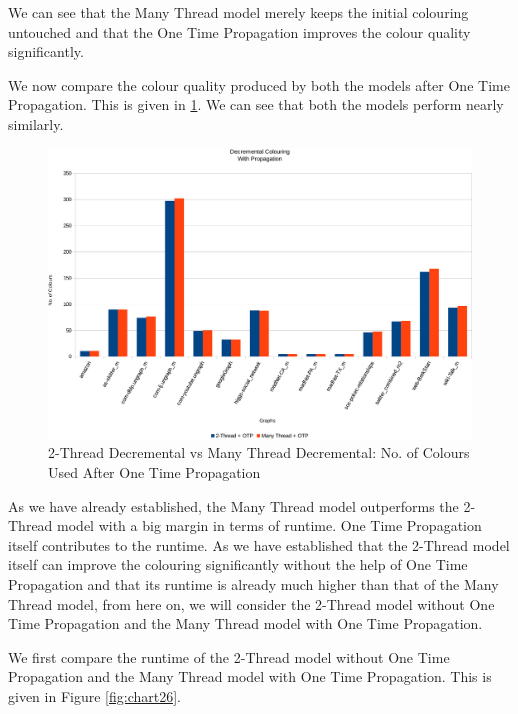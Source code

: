 \documentclass[MTech]{iitmdiss}
\begin{document}
We can see that the Many Thread model merely keeps the initial colouring untouched and that the One Time Propagation improves the colour quality significantly.

We now compare the colour quality produced by both the models after One Time Propagation. This is given in \ref{fig:chart25}. We can see that both the models perform nearly similarly.

\begin{figure}[h]
    \centering
    \includegraphics[width=\textwidth,keepaspectratio=true]{chartNewest25.pdf}
    \caption{
        2-Thread Decremental vs Many Thread Decremental: No. of Colours Used After One Time Propagation
    }
    \label{fig:chart25}
\end{figure}

As we have already established, the Many Thread model outperforms the 2-Thread model with a big margin in terms of runtime. One Time Propagation itself contributes to the runtime. As we have established that the 2-Thread model itself can improve the colouring significantly without the help of One Time Propagation and that its runtime is already much higher than that of the Many Thread model, from here on, we will consider the 2-Thread model without One Time Propagation and the Many Thread model with One Time Propagation.

We first compare the runtime of the 2-Thread model without One Time Propagation and the Many Thread model with One Time Propagation. This is given in Figure \ref{fig:chart26}.
\end{document}
